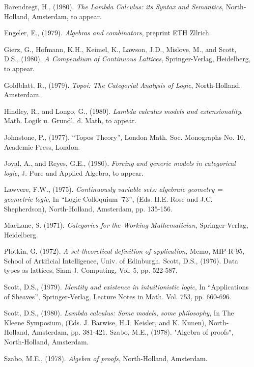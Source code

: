 \begin{thebibliography}{86}

 Barendregt, H., (1980). {\it The Lambda Calculus: its Syntax and
Semantics}, North-Holland, Amsterdam, to appear.

 Engeler, E., (1979).  {\it Algebras and combinators}, preprint ETH Zllrich.

 Gierz, G., Hofmann, K.H., Keimel, K., Lawson, J.D., Mislove, M., and Scott,
D.S., (1980). {\it A Compendium of Continuous Lattices}, Springer-Verlag, Heidelberg, to
appear.

 Goldblatt, R., (1979). {\it Topoi: The Categorial Analysis of Logic},
North-Holland, Amsterdam.

 Hindley, R., and Longo, G., (1980). {\it Lambda calculus models and
extensionality}, Math. Logik u. Grundl. d. Math, to appear.

Johnstone, P., (1977). ``Topos Theory'', London Math. Soc. Monographs No.
10, Academic Press, London.

 Joyal, A., and Reyes, G.E., (1980). {\it Forcing and generic models in
categorical logic}, J. Pure and Applied Algebra, to appear.

 Lawvere, F.W., (1975). {\it Continuously variable sets: algebraic
geometry$\,=\,$geometric logic}, In ``Logic Colloquium '73'', (Eds. H.E. Rose and J.C.
Shepherdson), North-Holland, Amsterdam, pp. 135-156.

 MacLane, S. (1971). {\it Categories for the Working Mathematician},
Springer-Verlag, Heidelberg.

 Plotkin, G. (1972). {\it A set-theoretical definition of application},
Memo, MIP-R-95, School of Artificial Intelligence, Univ. of Edinburgh. Scott, D.S.,
(1976). Data types as lattices, Siam J. Computing, Vol. 5, pp. 522-587.

 Scott, D.S., (1979). {\it Identity and existence in intuitionistic
logic}, In ``Applications of Sheaves'', Springer-Verlag, Lecture Notes in Math. Vol. 753,
pp. 660-696.

 Scott, D.S., (1980). {\it Lambda calculus: Some models, some philosophy},
In The Kleene Symposium, (Eds. J. Barwise, H.J. Keisler, and K. Kunen), North-Holland,
Amsterdam, pp. 381-421. Szabo, M.E., (1978). "Algebra of proofs", North-Holland,
Amsterdam.

 Szabo, M.E., (1978). {\it Algebra of proofs}, North-Holland, Amsterdam.

\end{thebibliography}
